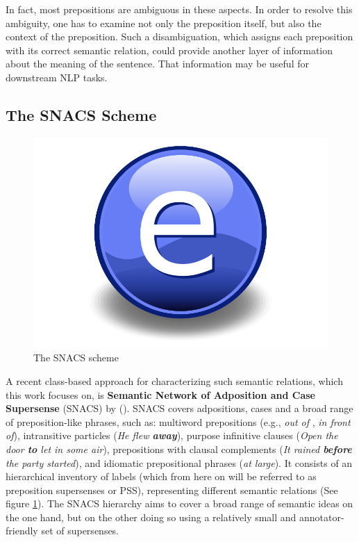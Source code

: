 In fact, most prepositions are ambiguous in these aspects. In order to resolve this ambiguity, one has to examine not only the preposition itself, but also the context of the preposition. Such a disambiguation, which assigns each preposition with its correct semantic relation, could provide another layer of information about the meaning of the sentence. That information may be useful for downstream NLP tasks.

\subsection{The SNACS Scheme} \label{sec:snacsscheme}

\begin{figure}
    \centering
    \includegraphics{Figures/Electron.pdf}
    \caption{The SNACS scheme}
    \label{fig:snacs}
\end{figure}

A recent class-based approach for characterizing such semantic relations, which this work focuses on, is \textbf{Semantic Network of Adposition and Case Supersense} (SNACS) by (\cite{snacs}). SNACS covers adpositions, cases and a broad range of preposition-like phrases, such as: multiword prepositions (e.g., \emph{out of} , \emph{in front of}), intransitive particles (\emph{He flew \textbf{away}}), purpose infinitive clauses (\emph{Open the door \textbf{to} let in some air}), prepositions with clausal complements (\emph{It rained \textbf{before} the party started}), and idiomatic prepositional phrases (\textit{at large}). It consists of an hierarchical inventory of labels (which from here on will be referred to as preposition supersenses or PSS), representing different semantic relations (See figure \ref{fig:snacs}). The SNACS hierarchy aims to cover a broad range of semantic ideas on the one hand, but on the other doing so using a relatively small and annotator-friendly set of supersenses.

